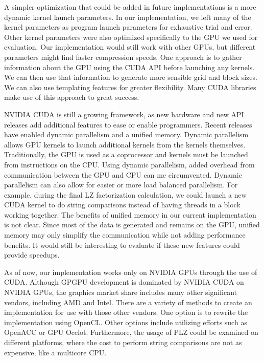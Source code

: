 A simpler optimization that could be added in future implementations is a more dynamic kernel launch parameters.
In our implementation, we left many of the kernel parameters as program launch parameters for exhaustive trial and error.
Other kernel parameters were also optimized specifically to the GPU we used for evaluation.
Our implementation would still work with other GPUs, but different parameters might find faster compression speeds.
One approach is to gather information about the GPU using the CUDA API before launching any kernels.
We can then use that information to generate more sensible grid and block sizes.
We can also use templating features for greater flexibility.
Many CUDA libraries make use of this approach to great success.

NVIDIA CUDA is still a growing framework, as new hardware and new API releases add additional features to ease or enable programmers.
Recent releases have enabled dynamic parallelism and a unified memory.
Dynamic parallelism allows GPU kernels to launch additional kernels from the kernels themselves.
Traditionally, the GPU is used as a coprocessor and kernels must be launched from instructions on the CPU.
Using dynamic parallelism, added overhead from communication between the GPU and CPU can me circumvented.
Dynamic parallelism can also allow for easier or more load balanced parallelism.
For example, during the final LZ factorization calculation, we could launch a new CUDA kernel to do string comparisons instead of having threads in a block working together.
The benefits of unified memory in our current implementation is not clear.
Since most of the data is generated and remains on the GPU, unified memory may only simplify the communication while not adding performance benefits.
It would still be interesting to evaluate if these new features could provide speedups.

As of now, our implementation works only on NVIDIA GPUs through the use of CUDA.
Although GPGPU development is dominated by NVIDIA CUDA on NVIDIA GPUs, the graphics market share includes many other significant vendors, including AMD and Intel.
There are a variety of methods to create an implementation for use with those other vendors.
One option is to rewrite the implementation using OpenCL.
Other options include utilizing efforts such as OpenACC or GPU Ocelot.
Furthermore, the usage of PLZ could be examined on different platforms, where the cost to perform string comparisons are not as expensive, like a multicore CPU.
